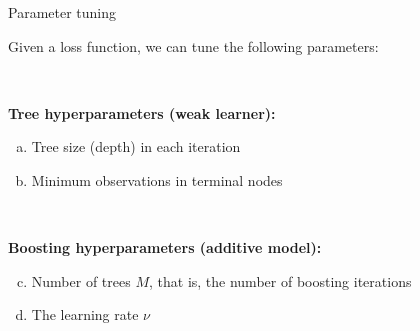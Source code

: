 \documentclass[
  10pt,
  ignorenonframetext,
]{beamer}
\begin{document}
\begin{frame}{Parameter tuning}
\label{parameter-tuning}
\(~\)

Given a loss function, we can tune the following parameters:

\(~\)

\textbf{Tree hyperparameters (weak learner):}

\begin{enumerate}
[a)]
\item
  Tree size (depth) in each iteration
\item
  Minimum observations in terminal nodes
\end{enumerate}

\(~\)

\textbf{Boosting hyperparameters (additive model):}

\begin{enumerate}
[a)]
\setcounter{enumi}{2}
\item
  Number of trees \(M\), that is, the number of boosting iterations
\item
  The learning rate \(\nu\)
\end{enumerate}
\end{frame}
\end{document}
